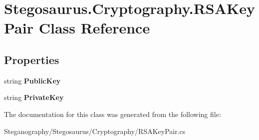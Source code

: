 \hypertarget{class_stegosaurus_1_1_cryptography_1_1_r_s_a_key_pair}{}\section{Stegosaurus.\+Cryptography.\+R\+S\+A\+Key\+Pair Class Reference}
\label{class_stegosaurus_1_1_cryptography_1_1_r_s_a_key_pair}
\subsection*{Properties}
\begin{DoxyCompactItemize}
\item 
string {\bfseries Public\+Key}\hypertarget{class_stegosaurus_1_1_cryptography_1_1_r_s_a_key_pair_ac89d59ddb3d4df97c5a16df091f98be7}{}\label{class_stegosaurus_1_1_cryptography_1_1_r_s_a_key_pair_ac89d59ddb3d4df97c5a16df091f98be7}

\item 
string {\bfseries Private\+Key}\hypertarget{class_stegosaurus_1_1_cryptography_1_1_r_s_a_key_pair_ae38147de52cb73bd84896c7ae9ca4746}{}\label{class_stegosaurus_1_1_cryptography_1_1_r_s_a_key_pair_ae38147de52cb73bd84896c7ae9ca4746}

\end{DoxyCompactItemize}


The documentation for this class was generated from the following file\+:\begin{DoxyCompactItemize}
\item 
Steganography/\+Stegosaurus/\+Cryptography/R\+S\+A\+Key\+Pair.\+cs\end{DoxyCompactItemize}
